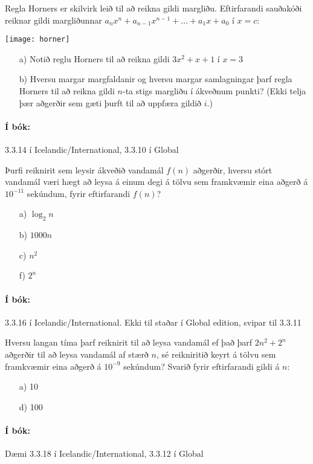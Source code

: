 \documentclass{article}
\begin{document}
\question

Regla Horners er skilvirk leið til að reikna gildi margliðu. Eftirfarandi sauðakóði reiknar gildi margliðunnar $a_nx^n + a_{n-1}x^{n-1}+\ldots+a_1x+a_0$ í $x = c$:

\begin{center}
    \texttt{[image: horner]}
\end{center}

\begin{itemize}
    \item[a)] Notið reglu Horners til að reikna gildi $3x^2+x+1$ í $x=3$
    \item[b)] Hversu margar margfaldanir og hversu margar samlagningar þarf regla Horners til að reikna gildi $n$-ta stigs margliðu í ákveðnum punkti? (Ekki telja þær aðgerðir sem gæti þurft til að uppfæra gildið $i$.)
\end{itemize}

\paragraph{Í bók:} 3.3.14 í Icelandic/International, 3.3.10 í Global

\question

Þurfi reiknirit sem leysir ákveðið vandamál $f(n)$ aðgerðir, hversu stórt vandamál væri hægt að leysa á einum degi á tölvu sem framkvæmir eina aðgerð á $10^{-11}$ sekúndum, fyrir eftirfarandi $f(n)$?

\begin{itemize}
    \item[a)] $\log_2 n$
    \item[b)] $1000n$
    \item[c)] $n^2$
    \item[f)] $2^n$
\end{itemize}

\paragraph{Í bók:} 3.3.16 í Icelandic/International. Ekki til staðar í Global edition, svipar til 3.3.11

\question

Hversu langan tíma þarf reiknirit til að leysa vandamál ef það þarf $2n^2+2^n$ aðgerðir til að leysa vandamál af stærð $n$, sé reikniritið keyrt á tölvu sem framkvæmir eina aðgerð á $10^{-9}$ sekúndum? Svarið fyrir eftirfarandi gildi á $n$:

\begin{itemize}
    \item[a)] 10
    \item[d)] 100
\end{itemize}

\paragraph{Í bók:} Dæmi 3.3.18 í Icelandic/International, 3.3.12 í Global
\end{document}
